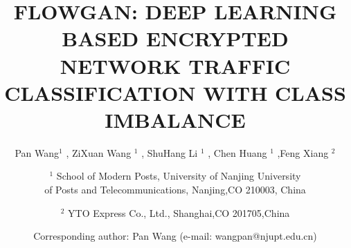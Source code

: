 \documentclass[letterpaper,12pt]{article}
\begin{document}
\date{}

\title{FLOWGAN: DEEP LEARNING BASED ENCRYPTED NETWORK TRAFFIC CLASSIFICATION WITH CLASS IMBALANCE }
\author{Pan Wang$^{1}$ , ZiXuan Wang $^{1}$ , ShuHang Li $^{1}$ , Chen Huang $^{1}$ ,Feng Xiang $^{2}$
   \and
   $^{1}$ School of Modern Posts, University of Nanjing University \\ of Posts and Telecommunications, Nanjing,CO 210003, China
   \and
   $^{2}$ YTO Express Co., Ltd., Shanghai,CO 201705,China
   \and
    Corresponding author: Pan Wang (e-mail: wangpan@njupt.edu.cn)
}




\maketitle

\thispagestyle{empty}
\end{document}
